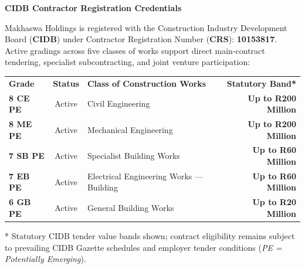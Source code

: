 \documentclass[a4paper,11pt]{article}
\begin{document}
\noindent
\begin{minipage}[t]{0.63\textwidth}
    \vspace{0pt}
    {\large\bfseries\color{mhnavy} CIDB Contractor Registration Credentials}
    \vspace{0.08cm}

    {\fontsize{8.6pt}{12.2pt}\selectfont\color{mhtext}
    Makhaswa Holdings is registered with the Construction Industry Development Board (\textbf{CIDB}) under Contractor Registration Number (\textbf{CRS}): \textbf{10153817}. Active gradings across five classes of works support direct main-contract tendering, specialist subcontracting, and joint venture participation:
    }

    \vspace{0.14cm}

    \renewcommand{\arraystretch}{1.24}
    \begin{tabularx}{\linewidth}{@{}l c X r@{}}
    \rowcolor{mhnavy}
    {\color{white}\bfseries\fontsize{7.6pt}{9.2pt}\selectfont Grade} &
    {\color{white}\bfseries\fontsize{7.6pt}{9.2pt}\selectfont Status} &
    {\color{white}\bfseries\fontsize{7.6pt}{9.2pt}\selectfont Class of Construction Works} &
    {\color{white}\bfseries\fontsize{7.6pt}{9.2pt}\selectfont Statutory Band*} \\
    \rowcolor{mhbluelight}
    \fontsize{7.5pt}{9.2pt}\selectfont\bfseries 8 CE PE & \fontsize{7.5pt}{9.2pt}\selectfont Active & \fontsize{7.5pt}{9.2pt}\selectfont Civil Engineering & \fontsize{7.5pt}{9.2pt}\selectfont\bfseries Up to R200 Million \\
    \fontsize{7.5pt}{9.2pt}\selectfont\bfseries 8 ME PE & \fontsize{7.5pt}{9.2pt}\selectfont Active & \fontsize{7.5pt}{9.2pt}\selectfont Mechanical Engineering & \fontsize{7.5pt}{9.2pt}\selectfont\bfseries Up to R200 Million \\
    \rowcolor{mhbluelight}
    \fontsize{7.5pt}{9.2pt}\selectfont\bfseries 7 SB PE & \fontsize{7.5pt}{9.2pt}\selectfont Active & \fontsize{7.5pt}{9.2pt}\selectfont Specialist Building Works & \fontsize{7.5pt}{9.2pt}\selectfont\bfseries Up to R60 Million \\
    \fontsize{7.5pt}{9.2pt}\selectfont\bfseries 7 EB PE & \fontsize{7.5pt}{9.2pt}\selectfont Active & \fontsize{7.5pt}{9.2pt}\selectfont Electrical Engineering Works --- Building & \fontsize{7.5pt}{9.2pt}\selectfont\bfseries Up to R60 Million \\
    \rowcolor{mhbluelight}
    \fontsize{7.5pt}{9.2pt}\selectfont\bfseries 6 GB PE & \fontsize{7.5pt}{9.2pt}\selectfont Active & \fontsize{7.5pt}{9.2pt}\selectfont General Building Works & \fontsize{7.5pt}{9.2pt}\selectfont\bfseries Up to R20 Million \\
    \end{tabularx}
    \renewcommand{\arraystretch}{1}

    \vspace{0.08cm}
    {\fontsize{6.9pt}{8.6pt}\selectfont\color{mhtextmuted}
    * Statutory CIDB tender value bands shown; contract eligibility remains subject to prevailing CIDB Gazette schedules and employer tender conditions (\textit{PE = Potentially Emerging}).
    }
\end{minipage}
\end{document}
